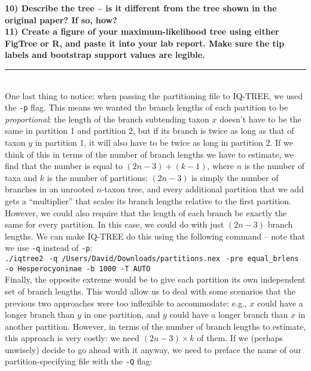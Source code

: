 \documentclass[12pt]{article}
\begin{document}
\noindent\textbf{10) Describe the tree -- is it different from the tree shown in the original paper? If so, how?} \\

\noindent\textbf{11) Create a figure of your maximum-likelihood tree using either FigTree or \textsf{R}, and paste it into your lab report. Make sure the tip labels and bootstrap support values are legible.} \\
\hrule
\ \\[1ex]
\noindent One last thing to notice: when passing the partitioning file to IQ-TREE, we used the \texttt{-p} flag. This means we wanted the branch lengths of each partition to be \textit{proportional}: the length of the branch subtending taxon $x$ doesn't have to be the same in partition 1 and partition 2, but if its branch is twice as long as that of taxon $y$ in partition 1, it will also have to be twice as long in partition 2. If we think of this in terms of the number of branch lengths we have to estimate, we find that the number is equal to $(2n - 3) + (k - 1)$, where $n$ is the number of taxa and $k$ is the number of partitions: $(2n - 3)$ is simply the number of branches in an unrooted $n$-taxon tree, and every additional partition that we add gets a ``multiplier'' that scales its branch lengths relative to the first partition. \\

\noindent However, we could also require that the length of each branch be exactly the same for every partition. In this case, we could do with just $(2n - 3)$ branch lengths. We can make IQ-TREE do this using the following command -- note that we use \texttt{-q} instead of \texttt{-p}: \\

\texttt{./iqtree2 $\,$-q /Users/David/Downloads/partitions.nex $\,$-pre equal\_brlens $\,\,$-o Hesperocyoninae -b 1000 -T AUTO} \\

\noindent Finally, the opposite extreme would be to give each partition its own independent set of branch lengths. This would allow us to deal with some scenarios that the previous two approaches were too inflexible to accommodate: e.g., $x$ could have a longer branch than $y$ in one partition, and $y$ could have a longer branch than $x$ in another partition. However, in terms of the number of branch lengths to estimate, this approach is very costly: we need $(2n - 3) \times k$ of them. If we (perhaps unwisely) decide to go ahead with it anyway, we need to preface the name of our partition-specifying file with the \texttt{-Q} flag: \\
\end{document}
